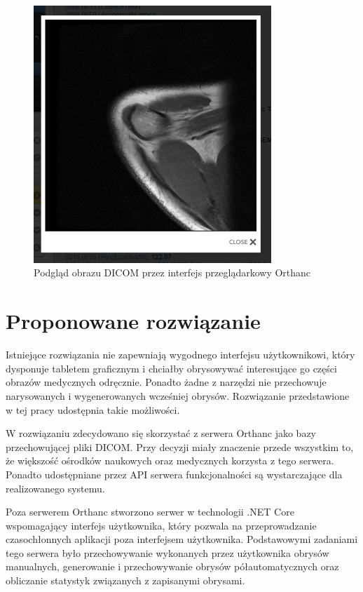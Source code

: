 \documentclass[a4paper,11pt,twoside]{report}
\theoremstyle{definition}
\begin{document}
\begin{figure}[h]
	\center
	\includegraphics[width=0.8\textwidth]{Orthanc-preview}
	\caption{Podgląd obrazu DICOM przez interfejs przeglądarkowy Orthanc}
    	\label{fig:Orthanc-preview}
\end{figure}


\section {Proponowane rozwiązanie}

Istniejące rozwiązania nie zapewniają wygodnego interfejsu użytkownikowi, który dysponuje tabletem graficznym i chciałby obrysowywać interesujące go części obrazów medycznych odręcznie. Ponadto żadne z narzędzi nie przechowuje narysowanych i wygenerowanych wcześniej obrysów.  Rozwiązanie przedstawione w tej pracy udostępnia takie możliwości.

W rozwiązaniu zdecydowano się skorzystać z serwera Orthanc jako bazy przechowującej pliki DICOM. Przy decyzji miały znaczenie przede wszystkim to, że większość ośrodków naukowych oraz medycznych korzysta z tego serwera. Ponadto udostępniane przez API serwera funkcjonalności są wystarczające dla realizowanego systemu. 

Poza serwerem Orthanc stworzono serwer w technologii .NET Core wspomagający interfejs użytkownika, który pozwala na przeprowadzanie czasochłonnych aplikacji poza interfejsem użytkownika. Podstawowymi zadaniami tego serwera było przechowywanie wykonanych przez użytkownika obrysów manualnych, generowanie i przechowywanie obrysów półautomatycznych oraz obliczanie statystyk związanych z zapisanymi obrysami.
\end{document}
